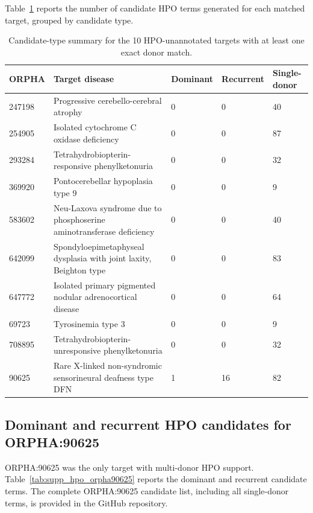 Table~\ref{tab:supp_target_candidate_summary} reports the number of candidate HPO terms generated for each matched target, grouped by candidate type.

\begin{table}[htbp]
\centering
\caption{Candidate-type summary for the 10 HPO-unannotated targets with at least one exact donor match.}
\label{tab:supp_target_candidate_summary}
\scriptsize
\setlength{\tabcolsep}{4pt}
\renewcommand{\arraystretch}{1.1}
\begin{tabularx}{\textwidth}{@{}p{}X p{}p{}p{}@{}}
\toprule
\textbf{ORPHA} & \textbf{Target disease} & \textbf{Dominant} & \textbf{Recurrent} & \textbf{Single-donor}  \\
\midrule
247198 & Progressive cerebello-cerebral atrophy & 0 & 0 & 40 \\
254905 & Isolated cytochrome C oxidase deficiency & 0 & 0 & 87 \\
293284 & Tetrahydrobiopterin-responsive phenylketonuria & 0 & 0 & 32 \\
369920 & Pontocerebellar hypoplasia type 9 & 0 & 0 & 9 \\
583602 & Neu-Laxova syndrome due to phosphoserine aminotransferase deficiency & 0 & 0 & 40 \\
642099 & Spondyloepimetaphyseal dysplasia with joint laxity, Beighton type & 0 & 0 & 83 \\
647772 & Isolated primary pigmented nodular adrenocortical disease & 0 & 0 & 64 \\
69723 & Tyrosinemia type 3 & 0 & 0 & 9 \\
708895 & Tetrahydrobiopterin-unresponsive phenylketonuria & 0 & 0 & 32 \\
90625 & Rare X-linked non-syndromic sensorineural deafness type DFN & 1 & 16 & 82 \\
\bottomrule
\end{tabularx}
\end{table}

\subsection{Dominant and recurrent HPO candidates for ORPHA:90625}
\label{supsec:orpha90625_hpo}

ORPHA:90625 was the only target with multi-donor HPO support. Table~\ref{tab:supp_hpo_orpha90625} reports the dominant and recurrent candidate terms. The complete ORPHA:90625 candidate list, including all single-donor terms, is provided in the GitHub repository.

